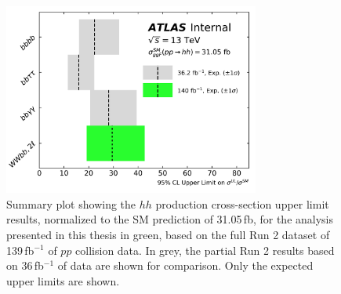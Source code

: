 \begin{figure}[!htb]
    \begin{center}
        \includegraphics[width=0.75\textwidth]{figures/search_hh/results/hh_ul_compPDF}
        \caption{
            Summary plot showing the $hh$ production cross-section upper limit results, normalized to
            the SM prediction of 31.05\,fb, for the analysis presented in this thesis in green,
            based on the full Run 2 dataset of 139\,fb$^{-1}$ of $pp$ collision data.
            In grey, the partial Run 2 results based on 36\,fb$^{-1}$ of data are shown for comparison.
            Only the expected upper limits are shown.
        }
        \label{fig:hh_ul_comp}
    \end{center}
\end{figure}


